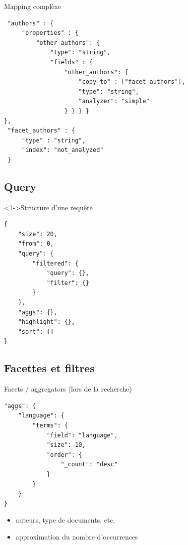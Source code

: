 \documentclass[hangout]{beamer}
\begin{document}
\begin{frame}[fragile]
	\begin{block}{Mapping complèxe}
		\begin{lstlisting}
 "authors" : {
     "properties" : {
         "other_authors": {
             "type": "string",
             "fields" : {
                 "other_authors": {
                     "copy_to" : ["facet_authors"],
                     "type": "string",
                     "analyzer": "simple"
                 } } } } 
},
 "facet_authors" : {
     "type" : "string",
     "index": "not_analyzed"
 }
		\end{lstlisting}
	\end{block}
\end{frame}

\subsection{Query}
\begin{frame}[fragile]
	\begin{block}<1->{Structure d'une requête}
			\begin{lstlisting}
{
    "size": 20,
    "from": 0,
    "query": {
        "filtered": {
            "query": {},
            "filter": {}
        } 
    },
    "aggs": {},
    "highlight": {},
    "sort": []
}
			\end{lstlisting}
	\end{block}
\end{frame}


\subsection{Facettes et filtres}
\begin{frame}[fragile]
	\begin{block}{Facets / aggregators (lors de la recherche)}
		\begin{lstlisting}
"aggs": {
    "language": {
        "terms": {
            "field": "language",
            "size": 10,
            "order": {
                "_count": "desc"
            }
        }
    }
}
		\end{lstlisting}
		\begin{itemize}
			\item auteurs, type de documents, etc.
			\item approximation du nombre d'occurrences
		\end{itemize}
	\end{block}
\end{frame}
\end{document}

